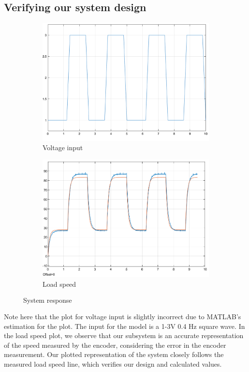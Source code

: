 \documentclass{article}
\begin{document}
\subsection{Verifying our system design}
\begin{figure}[H]
    \centering
    \begin{subfigure}[b]{0.45\linewidth}
        \centering
        \includegraphics[width=\linewidth]{voltage.png}
        \caption{Voltage input}
        \label{fig:voltage}
    \end{subfigure}
    \hfill
    \begin{subfigure}[b]{0.45\linewidth}
        \centering
        \includegraphics[width=\linewidth]{speed.png}
        \caption{Load speed}
        \label{fig:loadspeed}
    \end{subfigure}
    \caption{System response}
    \label{fig:response}
\end{figure}
Note here that the plot for voltage input is slightly incorrect due to MATLAB's estimation for the plot. The input for the model is a 1-3V 0.4 Hz square wave. In the load speed plot, we observe that our subsystem is an accurate representation of the speed measured by the encoder, considering the error in the encoder measurement. Our plotted representation of the system closely follows the measured load speed line, which verifies our design and calculated values. 
\end{document}
